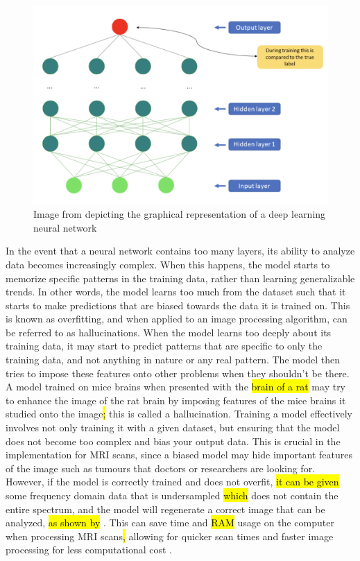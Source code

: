 \documentclass[14pt]{extreport}
\begin{document}
        \begin{figure}[h]
            \begin{center}
                \includegraphics[width = 0.6\linewidth]{Neural Network.png}
                \caption{Image from \cite{Lundervold_Lundervold_2019} depicting the graphical representation of a deep learning neural network}
            \end{center}
        \end{figure}

        In the event that a neural network contains too many layers, its ability to analyze data becomes increasingly complex. When this happens, the model starts to memorize specific patterns in the training data, rather than learning generalizable trends. In other words, the model learns too much from the dataset such that it starts to make predictions that are biased towards the data it is trained on. This is known as overfitting, and when applied to an image processing algorithm, can be referred to as hallucinations. When the model learns too deeply about its training data, it may start to predict patterns that are specific to only the training data, and not anything in nature or any real pattern. The model then tries to impose these features onto other problems when they shouldn't be there. A model trained on mice brains when presented with the \hl{brain of a rat} may try to enhance the image of the rat brain by imposing features of the mice brains it studied onto the image\hl{;} this is called a hallucination. Training a model effectively involves not only training it with a given dataset, but ensuring that the model does not become too complex and bias your output data. This is crucial in the implementation for MRI scans, since a biased model may hide important features of the image such as tumours that doctors or researchers are looking for. However, if the model is correctly trained and does not overfit, \hl{it can be given} some frequency domain data that is undersampled \hl{which} does not contain the entire spectrum, and the model will regenerate a correct image that can be analyzed, \hl{as shown by} \cite{Hyun_Kim_Lee_Lee_Seo_2018}. This can save time and \hl{RAM} usage on the computer when processing MRI scans\hl{,} allowing for quicker scan times and faster image processing for less computational cost \cite{Hyun_Kim_Lee_Lee_Seo_2018}. 
\end{document}
